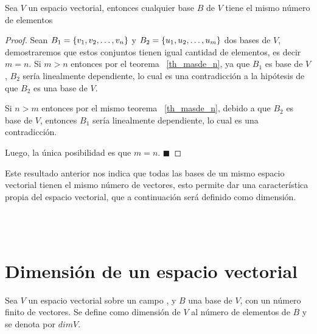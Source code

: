 \begin{theorem}
Sea $V$ un espacio vectorial, entonces cualquier base $B$ de $V$ tiene el mismo n\'umero de elementos
\end{theorem}

\begin{proof}
Sean $B_1= \lbrace v_1, v_2, \ldots, v_n \rbrace$ y $B_2= \lbrace u_1, u_2, \ldots, u_m \rbrace$ dos bases de $V$, demostraremos que estos conjuntos tienen igual cantidad de elementos, es decir $m=n$.
Si $m>n$ entonces por el teorema ~\ref{th_masde_n}, ya que $B_1$ es base de $V$, $B_2$ ser\'ia linealmente dependiente, lo cual es una contradicci\'on a la hip\'otesis de que $B_2$ es una base de $V$.

Si $n>m$ entonces por el mismo teorema ~\ref{th_masde_n}, debido a que $B_2$ es base de $V$, entonces $B_1$ ser\'ia linealmente dependiente, lo cual es una contradicci\'on.

Luego, la \'unica posibilidad es que $m=n$. $\blacksquare$
\end{proof}

Este resultado anterior nos indica que todas las bases de un mismo espacio vectorial tienen el mismo n\'umero de vectores, esto permite dar una caracter\'istica propia del espacio vectorial, que a continuaci\'on ser\'a definido como dimensi\'on.

~\\
~\\
\newpage
\section{Dimensión de un espacio vectorial}
\begin{dfn}[Dimensi\'on]
Sea $V$ un espacio vectorial sobre un campo \doblek, y $B$ una base de $V$, con un n\'umero finito de vectores. Se define como dimensi\'on de $V$ al n\'umero de elementos de $B$ y se denota por $dimV$.
~\\
\end{dfn}

